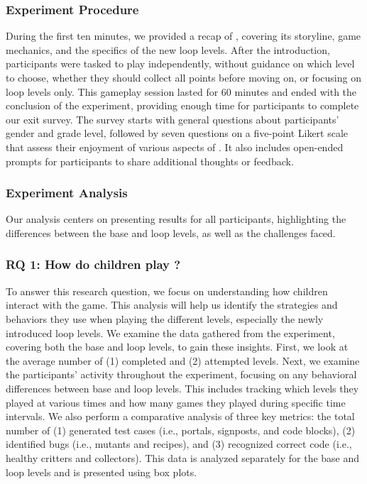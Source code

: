 \subsubsection{Experiment Procedure}

During the first ten minutes, we provided a recap of \toolname, covering its storyline, game mechanics, and the specifics of the new loop levels.
After the introduction, participants were tasked to play \toolname independently, without guidance on which level to choose, whether they should collect all points before moving on, or focusing on loop levels only. This gameplay session lasted for 60 minutes and ended with the conclusion of the experiment, providing enough time for participants to complete our exit survey. The survey starts with general questions about participants' gender and grade level, followed by seven questions on a five-point Likert scale that assess their enjoyment of various aspects of \toolname. It also includes open-ended prompts for participants to share additional thoughts or feedback.

\subsubsection{Experiment Analysis}

Our analysis centers on presenting results for all participants, highlighting the differences between the base and loop levels, as well as the challenges faced.

\subsubsection{RQ 1: How do children play \toolname?}

To answer this research question, we focus on understanding how children interact with the game. This analysis will help us identify the strategies and behaviors they use when playing the different levels, especially the newly introduced loop levels. We examine the data gathered from the experiment, covering both the base and loop levels, to gain these insights. First, we look at the average number of (1) completed and (2) attempted levels. Next, we examine the participants' activity throughout the experiment, focusing on any behavioral differences between base and loop levels.
This includes tracking which levels they played at various times and how many games they played during specific time intervals. We also perform a comparative analysis of three key metrics: the total number of (1) generated test cases (i.e., portals, signposts, and code blocks), (2) identified bugs (i.e., mutants and recipes), and (3) recognized correct code (i.e., healthy critters and collectors). This data is analyzed separately for the base and loop levels and is presented using box plots.

